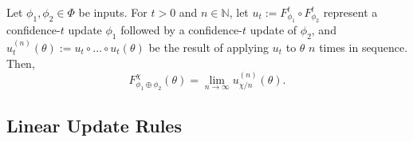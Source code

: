 \begin{prop}
	Let $\phi_1, \phi_2 \in \Phi$ be inputs.
	For $t > 0$ and $n \in \mathbb N$, let
	$u_t := F_{\phi_1}^t \circ F_{\phi_2}^t 
	$
 	represent 
	a confidence-$t$ update $\phi_1$ followed
	by a confidence-$t$ update of $\phi_2$,
	and
	$u_t^{(n)}(\theta) := u_t \circ\ldots\circ u_t(\theta)$
	be the result of applying $u_t$ to $\theta$ $n$ times in sequence.
	Then,	
	\[
		F_{\phi_1 \oplus \phi_2}^\chi(\theta) = 
			\lim_{n \to \infty} u_{\chi/n}^{(n)}(\theta)
		.
	\]
\end{prop}




%
%

%
%
\subsection{Linear Update Rules}

